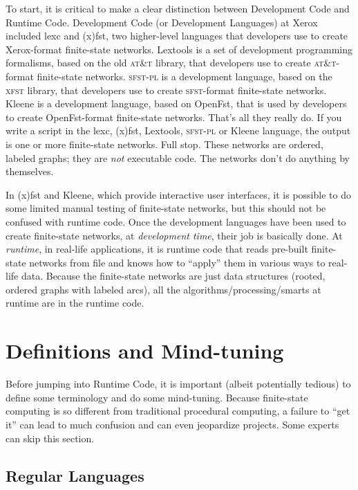 \documentclass[letterpaper,12pt]{article}
\providecommand{\acro}{}\renewcommand{\acro}{\textsc}
\begin{document}
To start, it is critical to make a clear distinction between Development Code and Runtime Code.  Development Code (or
Development Languages) at Xerox included lexc and
(x)fst, two higher-level languages that developers use to create Xerox-format finite-state networks.  Lextools is a set of development programming formalisms, based on the old
\acro{at\&t} library, that developers use to create \acro{at\&t}-format finite-state networks.  \acro{sfst-pl} is a development language, based on
the \acro{xfst} library, that developers use
to create \acro{sfst}-format finite-state networks.  Kleene is a development language, based on OpenFst, that is used by
developers to create OpenFst-format finite-state networks.  That's all they really do.   If you write
a script in the lexc, (x)fst, Lextools, \acro{sfst-pl} or Kleene language,
the output is one or more finite-state networks.  Full stop. These
networks are ordered, labeled graphs; they are \emph{not} executable
code.  The networks don't do anything by themselves.  

In (x)fst and Kleene, which provide interactive user interfaces, it
is possible to do some limited manual testing of finite-state networks, but this should not be confused with runtime
code.  Once the development languages have been used to create finite-state networks, at \emph{development time}, their job is
basically done.  At \emph{runtime}, in real-life applications, it is runtime code that reads
pre-built finite-state networks from file and knows how to ``apply'' them in various ways to real-life data.  Because the finite-state
networks are just data structures (rooted, ordered graphs with labeled arcs), all the
algorithms/processing/smarts at runtime are in the
runtime code.

\section{Definitions and Mind-tuning}

Before jumping into Runtime Code, it is important (albeit potentially tedious) to define some
terminology and do some mind-tuning.  Because finite-state computing is so different from traditional procedural computing, a failure to
``get it'' can lead to much confusion and can even jeopardize projects.  Some experts can skip
this section.

\subsection{Regular Languages}
\end{document}
